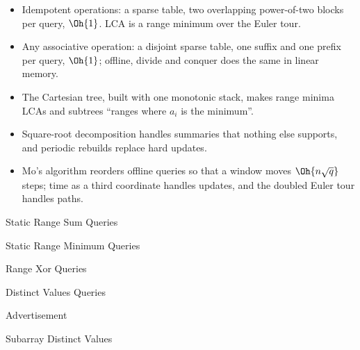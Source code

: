 \begin{summary}
\begin{itemize}
  \item Idempotent operations: a sparse table, two overlapping power-of-two blocks per query, $\Oh{1}$. LCA is a range minimum over
        the Euler tour.
  \item Any associative operation: a disjoint sparse table, one suffix and one prefix per query, $\Oh{1}$; offline, divide and
        conquer does the same in linear memory.
  \item The Cartesian tree, built with one monotonic stack, makes range minima LCAs and subtrees ``ranges where $a_i$ is the
        minimum''.
  \item Square-root decomposition handles summaries that nothing else supports, and periodic rebuilds replace hard updates.
  \item Mo's algorithm reorders offline queries so that a window moves $\Oh{n \sqrt q}$ steps; time as a third coordinate handles
        updates, and the doubled Euler tour handles paths.
\end{itemize}
\end{summary}

\begin{practice}
\begin{pplist}
  \item Static Range Sum Queries
  \item Static Range Minimum Queries
  \item Range Xor Queries
  \item Distinct Values Queries
  \item Advertisement
  \item Subarray Distinct Values
\end{pplist}
\end{practice}
